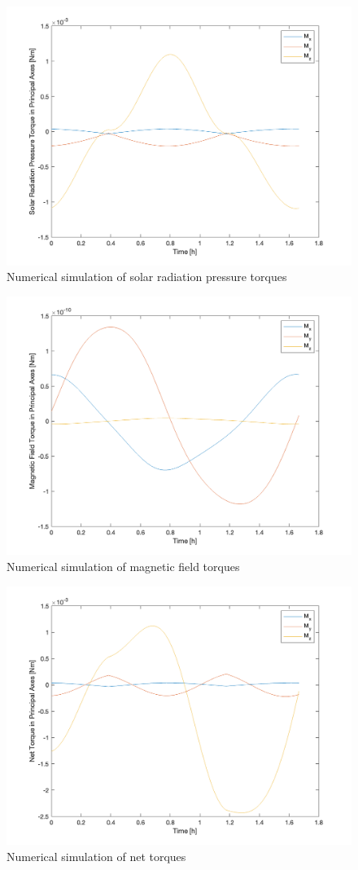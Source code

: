 \begin{figure}[H]
\centering
\includegraphics[scale=0.6]{Images/ps5_problem3_srp.png}
\caption{Numerical simulation of solar radiation pressure torques}
\label{fig:ps5_problem3_srp}
\end{figure}

\begin{figure}[H]
\centering
\includegraphics[scale=0.6]{Images/ps5_problem3_mag.png}
\caption{Numerical simulation of magnetic field torques}
\label{fig:ps5_problem3_mag}
\end{figure}

\begin{figure}[H]
\centering
\includegraphics[scale=0.6]{Images/ps5_problem3_net.png}
\caption{Numerical simulation of net torques}
\label{fig:ps5_problem3_net}
\end{figure}